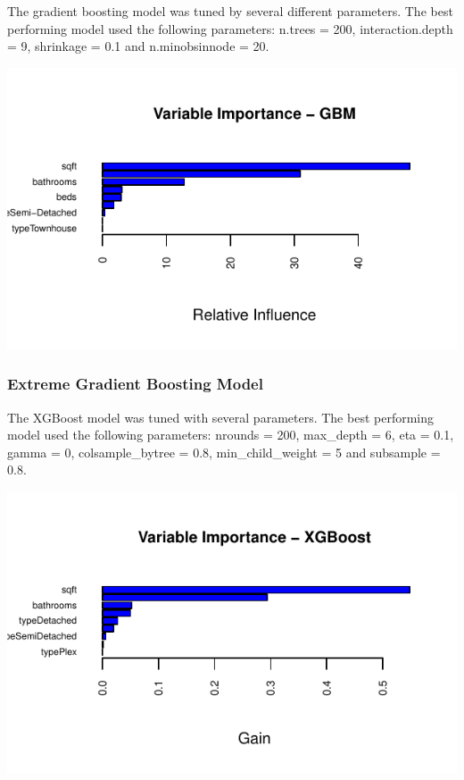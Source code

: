 \documentclass[11pt,]{article}
\begin{document}
The gradient boosting model was tuned by several different parameters.
The best performing model used the following parameters: n.trees = 200,
interaction.depth = 9, shrinkage = 0.1 and n.minobsinnode = 20.

\begin{center}\includegraphics{House_prices_report_files/figure-latex/GBM importance-1} \end{center}

\hypertarget{extreme-gradient-boosting-model}{%
\subsubsection{Extreme Gradient Boosting
Model}\label{extreme-gradient-boosting-model}}

The XGBoost model was tuned with several parameters. The best performing
model used the following parameters: nrounds = 200, max\_depth = 6, eta
= 0.1, gamma = 0, colsample\_bytree = 0.8, min\_child\_weight = 5 and
subsample = 0.8.

\begin{center}\includegraphics{House_prices_report_files/figure-latex/Extreme Gradient Boosting Model-1} \end{center}
\end{document}
